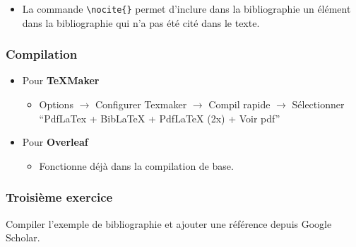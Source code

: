 \begin{frame}[fragile]
  \begin{itemize}
      \item La commande \lstinline|\nocite{}| permet d'inclure dans la bibliographie un élément dans la bibliographie qui n'a pas été cité dans le texte.
  \end{itemize}
\end{frame}

\begin{frame}[fragile]
  \frametitle{\Warning Compilation}
  \begin{itemize}
      \item Pour \textbf{TeXMaker}
      \begin{itemize}
          \item Options $\rightarrow$ Configurer Texmaker $\rightarrow$ Compil rapide $\rightarrow$ Sélectionner ``PdfLaTex + BibLaTeX + PdfLaTeX (2x) + Voir pdf''
      \end{itemize}
      \item Pour \textbf{Overleaf}
      \begin{itemize}
          \item Fonctionne déjà dans la compilation de base.
      \end{itemize}
  \end{itemize}
\end{frame}

\begin{frame}[fragile]
  \frametitle{Troisième exercice}
  \begin{center}
      Compiler l'exemple de bibliographie et ajouter une référence depuis Google Scholar.\vspace{0.5cm}
  \end{center}
\end{frame}

